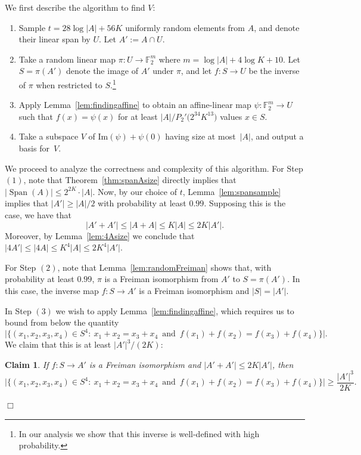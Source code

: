 \documentclass[11pt]{amsart}
\DeclareMathOperator{\vspan}{Span} %
\theoremstyle{plain}
\newtheorem{claim}[theorem]{Claim}
\theoremstyle{definition}
\theoremstyle{remark}
\renewenvironment{proof}[1][]{
    	\begin{trivlist}
     	\item[\hspace{\labelsep}{\em\noindent Proof#1:\/}]}
     	{{\hfill$\Box$}
    	\end{trivlist}
  }
\begin{document}
\begin{proof}
We first describe the algorithm to find $V$: 
\begin{enumerate}
    \item Sample $t = 28 \log|A| + 56K$ uniformly random elements from $A$, and denote their linear span by $U$.
    Let $A' := A\cap U$.
    \item Take a random linear map $\pi: U \to \mathbb{F}_2^m$ where $m = \log|A| + 4\log K + 10$. Let $S = \pi(A')$ denote the image of $A'$ under $\pi$, and let $f: S \to U$ be the inverse of $\pi$ when restricted to $S$.\footnote{In our analysis we show that this inverse is well-defined with high probability.}
    \item Apply Lemma~\ref{lem:findingaffine} to obtain an affine-linear map $\psi: \mathbb{F}_2^m \to U$ such that $f(x) = \psi(x)$ for at least $|A|/P_2'\big(2^{34}K^{13}\big)$ values $x \in S$.
    \item Take a subspace $V$ of $\textrm{Im}(\psi) + \psi(0)$ having size at most~$|A|$, and output a basis for~$V$.
\end{enumerate}

We proceed to analyze the correctness and complexity of this algorithm.
For Step $(1)$, note that Theorem~\ref{thm:spanAsize} directly implies that $|\vspan(A)|\leq 2^{2K}\cdot |A|$.
Now, by our choice of $t$, Lemma~\ref{lem:spansample} implies that  $|A'| \geq |A|/2$ with probability at least $0.99$.
Supposing this is the case, we have that
$$
|A' + A'|\leq |A+A|\leq  K|A| \leq 2K |A'|.
$$
Moreover, by Lemma~\ref{lem:4Asize} we conclude that  $|4A'| \leq |4A| \leq K^4 |A| \leq 2K^4 |A'|$.

For Step $(2)$, note that Lemma~\ref{lem:randomFreiman} shows that, with probability at least $0.99$, $\pi$ is a Freiman isomorphism from $A'$ to $S = \pi(A')$.
In this case, the inverse map $f: S\to A'$ is a Freiman isomorphism and $|S| = |A'|$.

In Step $(3)$ we wish to apply Lemma~\ref{lem:findingaffine}, which requires us to bound from below the quantity
$$\big|\big\{(x_1, x_2, x_3, x_4)\in S^4:\: x_1+x_2 = x_3+x_4 \,\text{ and }\, f(x_1)+f(x_2) = f(x_3)+f(x_4)\big\}\big|.$$
We claim that this is at least $|A'|^3/(2K)$:

\begin{claim}
    If $f: S \to A'$ is a Freiman isomorphism and $|A'+A'| \leq 2K |A'|$, then
    $$\big|\big\{(x_1, x_2, x_3, x_4)\in S^4:\: x_1+x_2 = x_3+x_4 \,\text{ and }\, f(x_1)+f(x_2) = f(x_3)+f(x_4)\big\}\big| \geq \frac{|A'|^3}{2K}.$$
\end{claim}


\end{proof}
\end{document}
